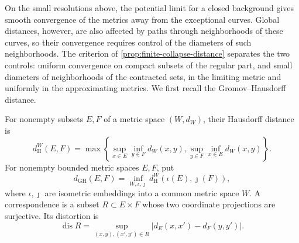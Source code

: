 On the small resolutions above, the potential limit for a closed background gives smooth convergence of the metrics away from the exceptional curves. Global distances, however, are also affected by paths through neighborhoods of these curves, so their convergence requires control of the diameters of such neighborhoods. The criterion of \cref{prop:finite-collapse-distance} separates the two controls: uniform convergence on compact subsets of the regular part, and small diameters of neighborhoods of the contracted sets, in the limiting metric and uniformly in the approximating metrics. We first recall the Gromov--Hausdorff distance.

\begin{definition}\label{def:bounded-gh-comparison}
For nonempty subsets $E,F$ of a metric space $(W,d_W)$, their Hausdorff distance is
\[
 d_{\mathrm H}^W(E,F)=\max\left\{
 \sup_{x\in E}\inf_{y\in F}d_W(x,y),
 \sup_{y\in F}\inf_{x\in E}d_W(x,y)\right\}.
\]
For nonempty bounded metric spaces $E,F$, put
\[
 d_{\mathrm{GH}}(E,F)
       =\inf_{W,\iota,\jmath}d_{\mathrm H}^W(\iota(E),\jmath(F)),
\]
where $\iota,\jmath$ are isometric embeddings into a common metric space $W$. A correspondence is a subset $R\subset E\times F$ whose two coordinate projections are surjective. Its distortion is
\[
 \operatorname{dis}R
       =\sup_{(x,y),(x',y')\in R}
              |d_E(x,x')-d_F(y,y')|.
\]
\end{definition}

